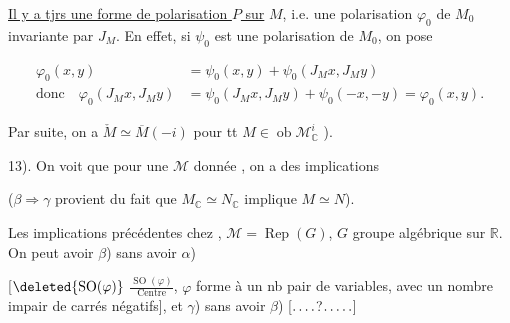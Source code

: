 
\uline{Il y a tjrs une forme de polarisation $P$ sur} $M$, i.e.  une polarisation $\varphi_0$ de $M_0$ invariante par $J_M$. En effet, si $\psi_0$ est une polarisation de $M_0$, on pose

\[
\begin{aligned}
\varphi_0(x,y)&=\psi_0(x,y)+\psi_0(J_Mx,J_My)\\
\text{donc}\quad\varphi_0(J_Mx,J_My)&=\psi_0(J_Mx,J_My)+\psi_0(-x,-y)=\varphi_0(x,y).
\end{aligned}
\]

Par suite, on a $\check M\simeq\overline M(-i)$ pour tt $M\in\operatorname{ob}\mathcal M_{\mathbb C}^i$ ).

13). On voit que pour une $\mathcal M$ donnée , on a des implications


($\beta\Rightarrow\gamma$ provient du fait que $M_{\mathbb C}\simeq N_{\mathbb C}$ implique $M\simeq N$).


Les implications précédentes   chez , $\mathcal M=\operatorname{Rep}(G)$, $G$ groupe algébrique   sur $\mathbb R$. On peut avoir $\beta$)  sans avoir $\alpha$)


[$\deleted{\operatorname{SO}(\varphi)}$  $\frac{\operatorname{SO}(\varphi)}{\text{Centre}}$, $\varphi$ forme à un nb pair de variables, avec un nombre impair de carrés négatifs], et $\gamma$) sans avoir $\beta$) [$\ldotp\ldotp\ldotp\ldotp$\quad ?\quad$\ldotp\ldotp\ldotp\ldotp\ldotp$]

